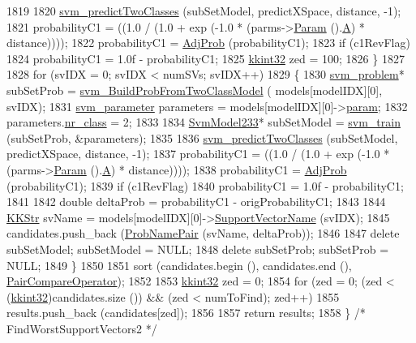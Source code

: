 \begin{DoxyCode}
1819 
1820     \hyperlink{namespace_s_v_m233_a558a3dbd2873b3211831500197cc7a59}{svm\_predictTwoClasses} (subSetModel, predictXSpace, distance, -1);
1821     probabilityC1 = ((1.0 / (1.0 + exp (-1.0 * (parms->\hyperlink{class_k_k_m_l_l_1_1_binary_class_parms_a8b29f264963789ce9145e8baa589b088}{Param} ().\hyperlink{struct_s_v_m233_1_1svm__parameter_ae77c2459a4305fca375197165412abe2}{A}) * distance))));
1822     probabilityC1 = \hyperlink{_s_v_m_model_8cpp_a40759ba6dc57dc1b738f1440a39eda2b}{AdjProb} (probabilityC1);
1823     \textcolor{keywordflow}{if}  (c1RevFlag)
1824       probabilityC1 = 1.0f - probabilityC1;
1825     \hyperlink{namespace_k_k_b_a8fa4952cc84fda1de4bec1fbdd8d5b1b}{kkint32} zed = 100;
1826   \}
1827 
1828   \textcolor{keywordflow}{for}  (svIDX = 0;  svIDX < numSVs;  svIDX++)
1829   \{
1830     \hyperlink{struct_s_v_m233_1_1svm__problem}{svm\_problem}*  subSetProb = \hyperlink{namespace_s_v_m233_a92802c240a20c37ae50a9d0eb6f74639}{svm\_BuildProbFromTwoClassModel}  (
      models[modelIDX][0], svIDX);
1831     \hyperlink{struct_s_v_m233_1_1svm__parameter}{svm\_parameter}  parameters = models[modelIDX][0]->\hyperlink{struct_s_v_m233_1_1_svm_model233_aea9d5d416f02777981c7677da2044571}{param};
1832     parameters.\hyperlink{struct_s_v_m233_1_1svm__parameter_a6fa48dd0b10a8f9cbbc8c0d571404345}{nr\_class} = 2;
1833 
1834     \hyperlink{struct_s_v_m233_1_1_svm_model233}{SvmModel233}*  subSetModel = \hyperlink{namespace_s_v_m233_a0f6331f1d29cc73bc32f39c104b8d74c}{svm\_train}  (subSetProb, &parameters);
1835 
1836     \hyperlink{namespace_s_v_m233_a558a3dbd2873b3211831500197cc7a59}{svm\_predictTwoClasses} (subSetModel, predictXSpace, distance, -1);
1837     probabilityC1 = ((1.0 / (1.0 + exp (-1.0 * (parms->\hyperlink{class_k_k_m_l_l_1_1_binary_class_parms_a8b29f264963789ce9145e8baa589b088}{Param} ().\hyperlink{struct_s_v_m233_1_1svm__parameter_ae77c2459a4305fca375197165412abe2}{A}) * distance))));
1838     probabilityC1 = \hyperlink{_s_v_m_model_8cpp_a40759ba6dc57dc1b738f1440a39eda2b}{AdjProb} (probabilityC1);
1839     \textcolor{keywordflow}{if}  (c1RevFlag)
1840       probabilityC1 = 1.0f - probabilityC1;
1841 
1842     \textcolor{keywordtype}{double}  deltaProb = probabilityC1 - origProbabilityC1;
1843 
1844     \hyperlink{class_k_k_b_1_1_k_k_str}{KKStr}  svName = models[modelIDX][0]->\hyperlink{struct_s_v_m233_1_1_svm_model233_aa21a0480268196554d0976bf73d059ed}{SupportVectorName} (svIDX);
1845     candidates.push\_back (\hyperlink{class_k_k_m_l_l_1_1_prob_name_pair}{ProbNamePair} (svName, deltaProb));
1846 
1847     \textcolor{keyword}{delete}  subSetModel;  subSetModel = NULL;
1848     \textcolor{keyword}{delete}  subSetProb;   subSetProb  = NULL;
1849   \}
1850 
1851   sort (candidates.begin (), candidates.end (), \hyperlink{namespace_k_k_m_l_l_aed4f24e07be0cb219051de190df720b4}{PairCompareOperator});
1852 
1853   \hyperlink{namespace_k_k_b_a8fa4952cc84fda1de4bec1fbdd8d5b1b}{kkint32}  zed = 0;
1854   \textcolor{keywordflow}{for}  (zed = 0;  (zed < (\hyperlink{namespace_k_k_b_a8fa4952cc84fda1de4bec1fbdd8d5b1b}{kkint32})candidates.size ())  &&  (zed < numToFind);  zed++)
1855     results.push\_back (candidates[zed]);
1856 
1857   \textcolor{keywordflow}{return}  results;
1858 \}  \textcolor{comment}{/* FindWorstSupportVectors2 */}
\end{DoxyCode}
